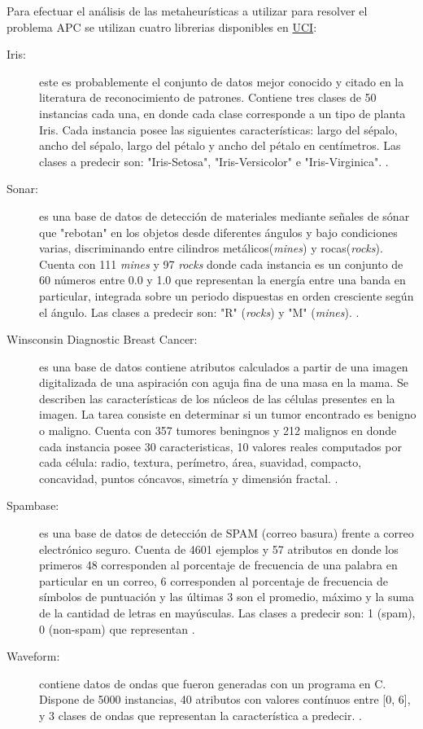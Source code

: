 \documentclass{ci5652}
\begin{document}
Para efectuar el análisis de las metaheurísticas a utilizar para resolver el
problema APC se utilizan cuatro librerias disponibles en
\href{http://archive.ics.uci.edu/ml/index.php}{UCI}:

\begin{description}
  \item [Iris:] este es probablemente el conjunto de datos mejor conocido y citado
  en la literatura de reconocimiento de patrones. Contiene tres clases de 50
  instancias cada una, en donde cada clase corresponde a un tipo de planta Iris.
  Cada instancia posee las siguientes características: largo del sépalo, ancho
  del sépalo, largo del pétalo y ancho del pétalo en centímetros. Las clases a
  predecir son: "Iris-Setosa", "Iris-Versicolor" e "Iris-Virginica".
  \cite{UCI_Iris}.

  \item [Sonar:] es una base de datos de detección de materiales mediante señales
  de sónar que "rebotan" en los objetos desde diferentes ángulos y bajo
  condiciones varias, discriminando entre cilindros metálicos(\textit{mines}) y
  rocas(\textit{rocks}). Cuenta con 111 \textit{mines} y 97 \textit{rocks} donde
  cada instancia es un conjunto de 60 números entre 0.0 y 1.0 que representan la
  energía entre una banda en particular, integrada sobre un periodo dispuestas
  en orden cresciente según el ángulo. Las clases a predecir son: "R"
  (\textit{rocks}) y "M" (\textit{mines}). \cite{UCI_Sonar}.

  \item [Winsconsin Diagnostic Breast Cancer:] es una base de datos contiene
  atributos calculados a partir de una imagen digitalizada de una aspiración con
  aguja fina de una masa en la mama. Se describen las características de los
  núcleos de las células presentes en la imagen. La tarea consiste en determinar
  si un tumor encontrado es benigno o maligno. Cuenta con 357 tumores beningnos
  y 212 malignos en donde cada instancia posee 30 caracteristicas, 10 valores
  reales computados por cada célula: radio, textura, perímetro, área, suavidad,
  compacto, concavidad, puntos cóncavos, simetría y dimensión fractal.
  \cite{UCI_WDBC}.

  \item [Spambase:] es una base de datos de detección de SPAM (correo basura)
  frente a correo electrónico seguro. Cuenta de 4601 ejemplos y 57 atributos en
  donde los primeros 48 corresponden al porcentaje de frecuencia de una palabra
  en particular en un correo, 6 corresponden al porcentaje de frecuencia de
  símbolos de puntuación y las últimas 3 son el promedio, máximo y la suma de la
  cantidad de letras en mayúsculas. Las clases a predecir son: 1 (spam), 0
  (non-spam) que representan \cite{UCI_SpamBase}.

  \item [Waveform:] contiene datos de ondas que fueron generadas con un programa
  en C. Dispone de 5000 instancias, 40 atributos con valores contínuos entre
  [0, 6], y 3 clases de ondas que representan la característica a predecir.
  \cite{UCI_Waveform}.

\end{description}
\end{document}
